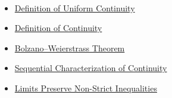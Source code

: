 \begin{remark*}[Dependencies]~\\
\begin{itemize}
  \item \hyperref[def:uniform-continuity]{Definition of Uniform Continuity}
  \item \hyperref[def:continuity]{Definition of Continuity}
  \item \hyperref[thm:bolzano-weierstrass]{Bolzano--Weierstrass Theorem}
  \item \hyperref[thm:sequential-continuity]{Sequential Characterization of Continuity}
  \item \hyperref[thm:limits-preserve-inequalities]{Limits Preserve Non-Strict Inequalities}
\end{itemize}
\end{remark*}

\clearpage
